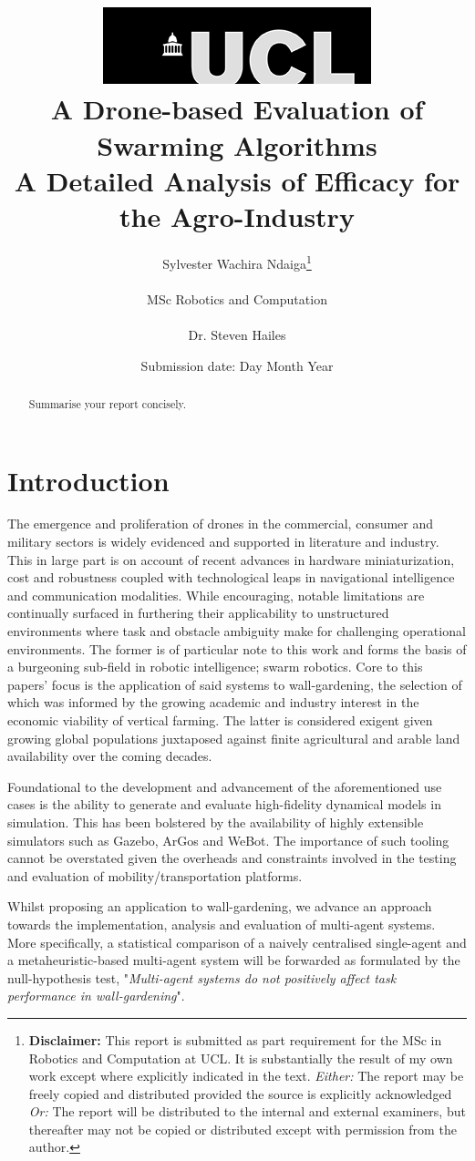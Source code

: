 \documentclass{report}
\title{  	{ \includegraphics[scale=.5]{ucl_logo.png}}\\
{{\Huge A Drone-based Evaluation of Swarming Algorithms}}\\
{\large A Detailed Analysis of Efficacy for the Agro-Industry}\\
		}
\date{Submission date: Day Month Year}
\author{Sylvester Wachira Ndaiga\thanks{
{\bf Disclaimer:}
This report is submitted as part requirement for the MSc in Robotics and Computation at UCL. It is
substantially the result of my own work except where explicitly indicated in the text.
\emph{Either:} The report may be freely copied and distributed provided the source is explicitly acknowledged
\newline  %
\emph{Or:}\newline
The report will be distributed to the internal and external examiners, but thereafter may not be copied or distributed except with permission from the author.}
\\ \\
MSc Robotics and Computation\\ \\
Dr. Steven Hailes}
\begin{document}
 
 \onehalfspacing
\maketitle
\begin{abstract}
Summarise your report concisely.
\end{abstract}
\tableofcontents
\setcounter{page}{1}

\chapter{Introduction}

The emergence and proliferation of drones in the commercial, consumer and military sectors is widely evidenced and supported in literature and industry. This in large part is on account of recent advances in hardware miniaturization, cost and robustness coupled with technological leaps in navigational intelligence and communication modalities. While encouraging, notable limitations are continually surfaced in furthering their applicability to unstructured environments where task and obstacle ambiguity make for challenging operational environments. The former is of particular note to this work and forms the basis of a burgeoning sub-field in robotic intelligence; swarm robotics. Core to this papers' focus is the application of said systems to wall-gardening, the selection of which was informed by the growing academic and industry \cite{gmi_2017} interest in the economic viability of vertical farming. The latter is considered exigent \cite{Banerjee2014} given growing global populations juxtaposed against finite agricultural and arable land availability over the coming decades.

Foundational to the development and advancement of the aforementioned use cases is the ability to generate and evaluate high-fidelity dynamical models in simulation. This has been bolstered by the availability of highly extensible simulators such as Gazebo, ArGos and WeBot. The importance of such tooling cannot be overstated given the overheads and constraints involved in the testing and evaluation of mobility/transportation platforms.

Whilst proposing an application to wall-gardening, we advance an approach towards the implementation, analysis and evaluation of multi-agent systems. More specifically, a statistical comparison of a naively centralised single-agent and a metaheuristic-based multi-agent system will be forwarded as formulated by the null-hypothesis test, "\textit{Multi-agent systems do not positively affect task performance in wall-gardening}".
\end{document}

